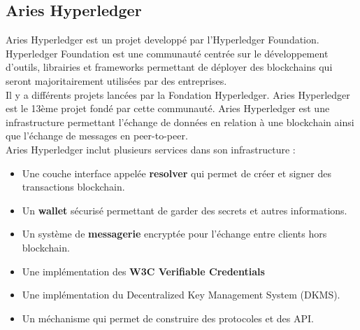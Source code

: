 \documentclass[12pt, openany]{report}
\begin{document}
\subsection{Aries Hyperledger}
\noindent 
\begin{flushleft}
Aries Hyperledger est un projet developpé par l'Hyperledger Foundation. Hyperledger Foundation est une communauté centrée sur le développement d'outils, librairies et frameworks permettant de déployer des blockchains qui seront majoritairement utilisées par des entreprises. \\
Il y a différents projets lancées par la Fondation Hyperledger. Aries Hyperledger est le 13ème projet fondé par cette communauté. Aries Hyperledger est une infrastructure permettant l'échange de données en relation à une blockchain ainsi que l'échange de messages en peer-to-peer. \\
\vspace{2mm}
Aries Hyperledger inclut plusieurs services dans son infrastructure :
\begin{itemize}
\item Une couche interface appelée \textbf{resolver} qui permet de créer et signer des transactions blockchain.
\item Un \textbf{wallet} sécurisé permettant de garder des secrets et autres informations. 
\item Un système de \textbf{messagerie} encryptée pour l'échange entre clients hors blockchain.
\item Une implémentation des \textbf{W3C Verifiable Credentials} 
\item Une implémentation du Decentralized Key Management System (DKMS).
\item Un méchanisme qui permet de construire des protocoles et des API.


\end{itemize}
\end{flushleft}
\end{document}
